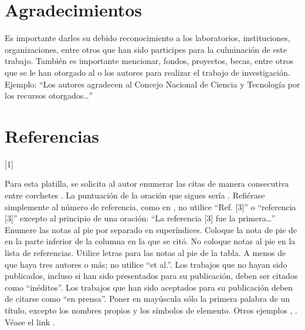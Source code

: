     \section{Agradecimientos}
    
    Es importante darles su debido reconocimiento a los laboratorios, instituciones, organizaciones, entre otros que han sido participes para la culminación de este trabajo. También es importante mencionar, fondos, proyectos, becas, entre otros que se le han otorgado al o los autores para realizar el trabajo de investigación. Ejemplo: “Los autores agradecen al Concejo Nacional de Ciencia y Tecnología por los recursos otorgados…”
    
    \section*{Referencias}
    
    [1] \cite{Maynard's}
    
    
    
    Para esta platilla, se solicita al autor enumerar las citas de manera consecutiva entre corchetes \cite{YLi2013}. 
    La puntuación de la oración que sigues sería \cite{Mesaelides2011}. 
    Refiérase simplemente al número de referencia, como en \cite{Morales2012}, no utilice “Ref. [3]” o “referencia [3]” excepto al principio de una oración: “La referencia [3] fue la primera…”
    Enumere las notas al pie por separado en superíndices. Coloque la nota de pie de en la parte inferior de la columna en la que se citó. No coloque notas al pie en la lista de referencias. Utilice letras para las notas al pie de la tabla.
    A menos de que haya tres autores o más; no utilice “et al.”. Los trabajos que no hayan sido publicados, incluso si han sido presentados para su publicación, deben ser citados como “inéditos”. Los trabajos que han sido aceptados para su publicación deben de citarse como “en prensa”. Poner en mayúscula sólo la primera palabra de un título, excepto los nombres propios y los símbolos de elemento. 
    Otros ejemplos \cite{LAAngeles2021}, \cite{LAAngelesConni}. 
    Véase el link \cite{prueba}.
    
    
